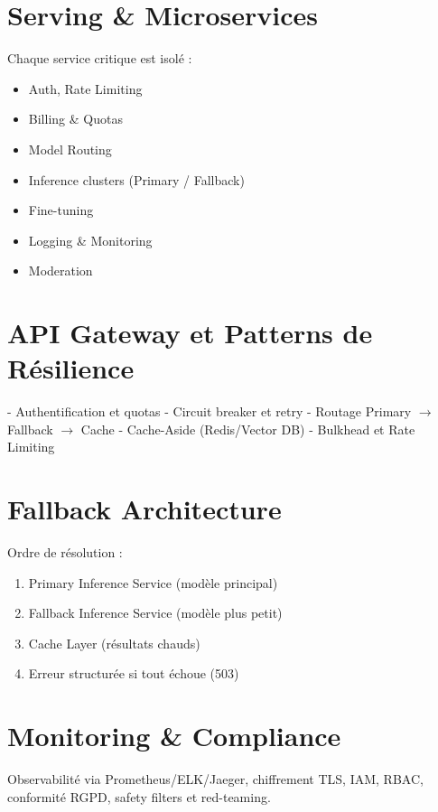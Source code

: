 \documentclass[12pt,a4paper]{article}
\begin{document}
\section*{Serving \& Microservices}
Chaque service critique est isolé :
\begin{itemize}
    \item Auth, Rate Limiting
    \item Billing \& Quotas
    \item Model Routing
    \item Inference clusters (Primary / Fallback)
    \item Fine-tuning
    \item Logging \& Monitoring
    \item Moderation
\end{itemize}

\section*{API Gateway et Patterns de Résilience}
- Authentification et quotas  
- Circuit breaker et retry  
- Routage Primary $\rightarrow$ Fallback $\rightarrow$ Cache  
- Cache-Aside (Redis/Vector DB)  
- Bulkhead et Rate Limiting  

\section*{Fallback Architecture}
Ordre de résolution :
\begin{enumerate}
    \item Primary Inference Service (modèle principal)
    \item Fallback Inference Service (modèle plus petit)
    \item Cache Layer (résultats chauds)
    \item Erreur structurée si tout échoue (503)
\end{enumerate}

\section*{Monitoring \& Compliance}
Observabilité via Prometheus/ELK/Jaeger, chiffrement TLS, IAM, RBAC, conformité RGPD, safety filters et red-teaming.
\end{document}
